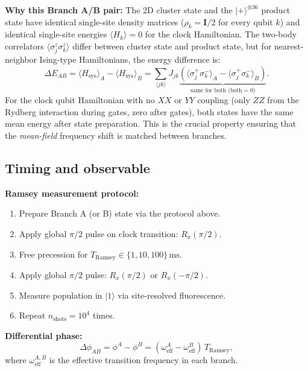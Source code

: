 \documentclass[12pt,letterpaper]{article}
\theoremstyle{plain}
\theoremstyle{definition}
\theoremstyle{remark}
\begin{document}
\textbf{Why this Branch A/B pair:} The 2D cluster state and the $|+\rangle^{\otimes 36}$ product state have identical single-site density matrices ($\rho_k = \mathbf{I}/2$ for every qubit $k$) and identical single-site energies $\langle H_k\rangle = 0$ for the clock Hamiltonian. The two-body correlators $\langle\sigma^z_j\sigma^z_k\rangle$ differ between cluster state and product state, but for nearest-neighbor Ising-type Hamiltonians, the energy difference is:
\begin{equation}
  \Delta E_{AB} = \langle H_{\mathrm{sys}}\rangle_A - \langle H_{\mathrm{sys}}\rangle_B
  = \sum_{\langle jk\rangle} J_{jk}\underbrace{\left(\langle\sigma^+_j\sigma^-_k\rangle_A - \langle\sigma^+_j\sigma^-_k\rangle_B\right)}_{\text{same for both (both}=0\text{)}}.
  \label{eq:energy-diff}
\end{equation}
For the clock qubit Hamiltonian with no $XX$ or $YY$ coupling (only $ZZ$ from the Rydberg interaction during gates, zero after gates), both states have the same mean energy after state preparation. This is the crucial property ensuring that the \emph{mean-field} frequency shift is matched between branches.

\subsection{Timing and observable}

\textbf{Ramsey measurement protocol:}
\begin{enumerate}
\item Prepare Branch A (or B) state via the protocol above.
\item Apply global $\pi/2$ pulse on clock transition: $R_x(\pi/2)$.
\item Free precession for $T_{\mathrm{Ramsey}} \in \{1, 10, 100\}\,\text{ms}$.
\item Apply global $\pi/2$ pulse: $R_x(\pi/2)$ or $R_x(-\pi/2)$.
\item Measure population in $|1\rangle$ via site-resolved fluorescence.
\item Repeat $n_{\mathrm{shots}} = 10^4$ times.
\end{enumerate}

\textbf{Differential phase:}
\begin{equation}
  \Delta\phi_{AB}
  = \phi^A - \phi^B
  = (\omega^A_{\mathrm{eff}} - \omega^B_{\mathrm{eff}})\,T_{\mathrm{Ramsey}},
  \label{eq:Delta-phi}
\end{equation}
where $\omega^{A,B}_{\mathrm{eff}}$ is the effective transition frequency in each branch.
\end{document}
